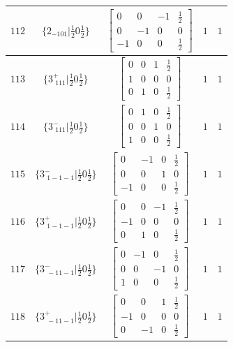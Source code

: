 \documentclass[fleqn,8pt]{jsarticle}
\begin{document}
\begin{longtable}{ccccc}
$ 112 $ & $ \{2{}_{-101}|\frac{1}{2} 0 \frac{1}{2}\} $ & $ \begin{bmatrix} 0 & 0 & -1 & \frac{1}{2} \\ 0 & -1 & 0 & 0 \\ -1 & 0 & 0 & \frac{1}{2} \end{bmatrix} $ & $ 1 $ & $ 1 $ \\ \hline
$ 113 $ & $ \{3^{+}_{\,\,111}|\frac{1}{2} 0 \frac{1}{2}\} $ & $ \begin{bmatrix} 0 & 0 & 1 & \frac{1}{2} \\ 1 & 0 & 0 & 0 \\ 0 & 1 & 0 & \frac{1}{2} \end{bmatrix} $ & $ 1 $ & $ 1 $ \\ \hline
$ 114 $ & $ \{3^{-}_{\,\,111}|\frac{1}{2} 0 \frac{1}{2}\} $ & $ \begin{bmatrix} 0 & 1 & 0 & \frac{1}{2} \\ 0 & 0 & 1 & 0 \\ 1 & 0 & 0 & \frac{1}{2} \end{bmatrix} $ & $ 1 $ & $ 1 $ \\ \hline
$ 115 $ & $ \{3^{-}_{\,\,1-1-1}|\frac{1}{2} 0 \frac{1}{2}\} $ & $ \begin{bmatrix} 0 & -1 & 0 & \frac{1}{2} \\ 0 & 0 & 1 & 0 \\ -1 & 0 & 0 & \frac{1}{2} \end{bmatrix} $ & $ 1 $ & $ 1 $ \\ \hline
$ 116 $ & $ \{3^{+}_{\,\,1-1-1}|\frac{1}{2} 0 \frac{1}{2}\} $ & $ \begin{bmatrix} 0 & 0 & -1 & \frac{1}{2} \\ -1 & 0 & 0 & 0 \\ 0 & 1 & 0 & \frac{1}{2} \end{bmatrix} $ & $ 1 $ & $ 1 $ \\ \hline
$ 117 $ & $ \{3^{-}_{\,\,-11-1}|\frac{1}{2} 0 \frac{1}{2}\} $ & $ \begin{bmatrix} 0 & -1 & 0 & \frac{1}{2} \\ 0 & 0 & -1 & 0 \\ 1 & 0 & 0 & \frac{1}{2} \end{bmatrix} $ & $ 1 $ & $ 1 $ \\ \hline
$ 118 $ & $ \{3^{+}_{\,\,-11-1}|\frac{1}{2} 0 \frac{1}{2}\} $ & $ \begin{bmatrix} 0 & 0 & 1 & \frac{1}{2} \\ -1 & 0 & 0 & 0 \\ 0 & -1 & 0 & \frac{1}{2} \end{bmatrix} $ & $ 1 $ & $ 1 $ \\ \hline

\end{longtable}
\end{document}
